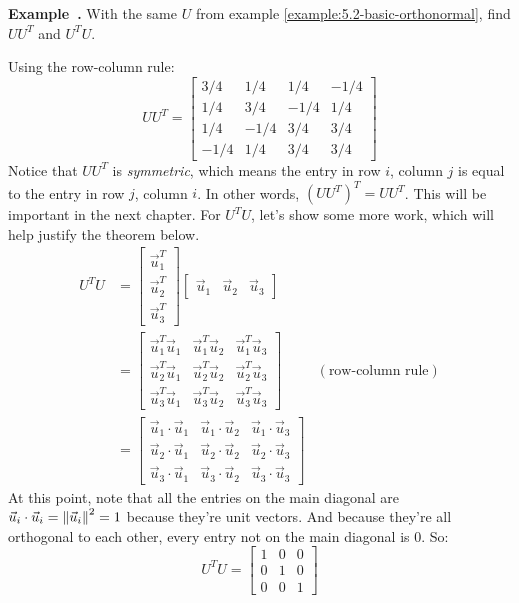 \documentclass[11pt, letterpaper]{report}
\newenvironment{notes}{}{}
\newenvironment{book}{}{}
\let\originalleft\left
\let\originalright\right
\renewcommand{\left}{\mathopen{}\mathclose\bgroup\originalleft}
\renewcommand{\right}{\aftergroup\egroup\originalright}
\newcounter{example}[section]
\newcommand{\example}{\refstepcounter{example}%
\par\noindent\textbf{Example~\theexample.} }
\newcounter{theorem}[chapter]
\newcommand\nm[1]{\left\lVert #1 \right\rVert}
\begin{document}
\example {} With the same $U$ from example \ref{example:5.2-basic-orthonormal}, find $UU^{T}$ and $U^TU$.

\begin{notes}
\vfill
\end{notes}

\begin{book}
Using the row-column rule:
\[UU^T = \begin{bmatrix}
3/4 & 1/4 & 1/4 & -1/4 \\
1/4 & 3/4 & -1/4 & 1/4 \\
1/4 & -1/4 & 3/4 & 3/4 \\
-1/4 & 1/4 & 3/4 & 3/4
\end{bmatrix}\]
Notice that $UU^T$ is \emph{symmetric}, which means the entry in row $i$, column $j$ is equal to the entry in row $j$, column $i$. In other words, $( UU^T )^T = UU^T$. This will be important in the next chapter. For $U^TU$, let's show some more work, which will help justify the theorem below.
\begin{align*}
U^TU&= \begin{bmatrix}
\vec{u}_1^T \\ \vec{u}_2^T \\ \vec{u}_3^T
\end{bmatrix}\begin{bmatrix}
\vec{u}_1 & \vec{u}_2 & \vec{u}_3
\end{bmatrix} \\
&= \begin{bmatrix}
\vec{u}_1^T\vec{u}_1 & \vec{u}_1^T\vec{u}_2 & \vec{u}_1^T\vec{u}_3 \\
\vec{u}_2^T\vec{u}_1 & \vec{u}_2^T\vec{u}_2 & \vec{u}_2^T\vec{u}_3 \\
\vec{u}_3^T\vec{u}_1 & \vec{u}_3^T\vec{u}_2 & \vec{u}_3^T\vec{u}_3 
\end{bmatrix} & (\text{row-column rule}) \\
&= \begin{bmatrix}
\vec{u}_1\cdot\vec{u}_1 & \vec{u}_1\cdot\vec{u}_2 & \vec{u}_1\cdot\vec{u}_3 \\
\vec{u}_2\cdot\vec{u}_1 & \vec{u}_2\cdot\vec{u}_2 & \vec{u}_2\cdot\vec{u}_3 \\
\vec{u}_3\cdot\vec{u}_1 & \vec{u}_3\cdot\vec{u}_2 & \vec{u}_3\cdot\vec{u}_3 
\end{bmatrix}
\end{align*}
At this point, note that all the entries on the main diagonal are $\vec{u}_i\cdot \vec{u}_i = \nm{\vec{u}_i}^2 = 1$ because they're unit vectors. And because they're all orthogonal to each other, every entry not on the main diagonal is 0. So: \[U^TU = \begin{bmatrix}
1 & 0 & 0 \\
0 & 1 & 0 \\
0 & 0 & 1
\end{bmatrix}\]

\blacksquare
\end{book}
\end{document}
